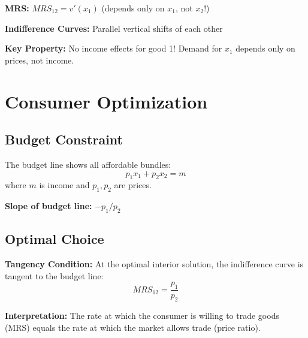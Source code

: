\documentclass[11pt,a4paper]{article}
\begin{document}
\textbf{MRS:} $MRS_{12} = v'(x_1)$ (depends only on $x_1$, not $x_2$!)

\textbf{Indifference Curves:} Parallel vertical shifts of each other

\begin{center}
\end{center}

\textbf{Key Property:} No income effects for good 1! Demand for $x_1$ depends only on prices, not income.

\section{Consumer Optimization}

\subsection{Budget Constraint}

The budget line shows all affordable bundles:
\[
p_1 x_1 + p_2 x_2 = m
\]
where $m$ is income and $p_1, p_2$ are prices.

\textbf{Slope of budget line:} $-p_1/p_2$

\subsection{Optimal Choice}

\textbf{Tangency Condition:} At the optimal interior solution, the indifference curve is tangent to the budget line:
\[
MRS_{12} = \frac{p_1}{p_2}
\]

\textbf{Interpretation:} The rate at which the consumer is willing to trade goods (MRS) equals the rate at which the market allows trade (price ratio).
\end{document}

